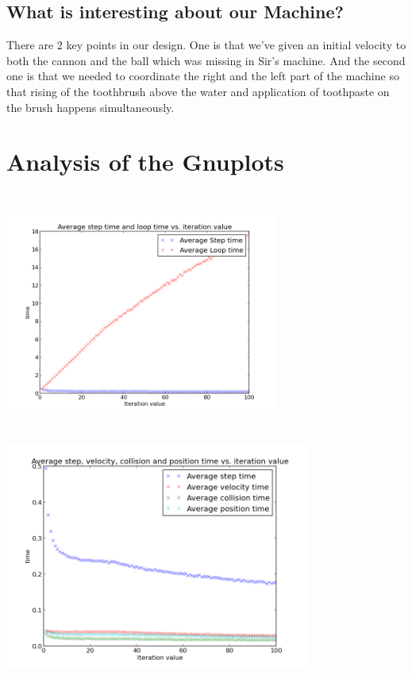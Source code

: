 \documentclass[11pt]{article}
\begin{document}
\subsection{What is interesting about our Machine?}
There are 2 key points in our design. One is that we've given an initial velocity to both the cannon and the ball which was missing in Sir's machine. And the second one is that we needed to coordinate the right and the left part of the machine so that rising of the toothbrush above the water and application of toothpaste on the brush happens simultaneously.

\section{Analysis of the Gnuplots}  
\includegraphics[height=8cm,width=9cm]{plots_doc/g10_plot01_re}
\includegraphics[height=8cm,width=10cm]{plots_doc/g10_plot02_re}
\end{document}

